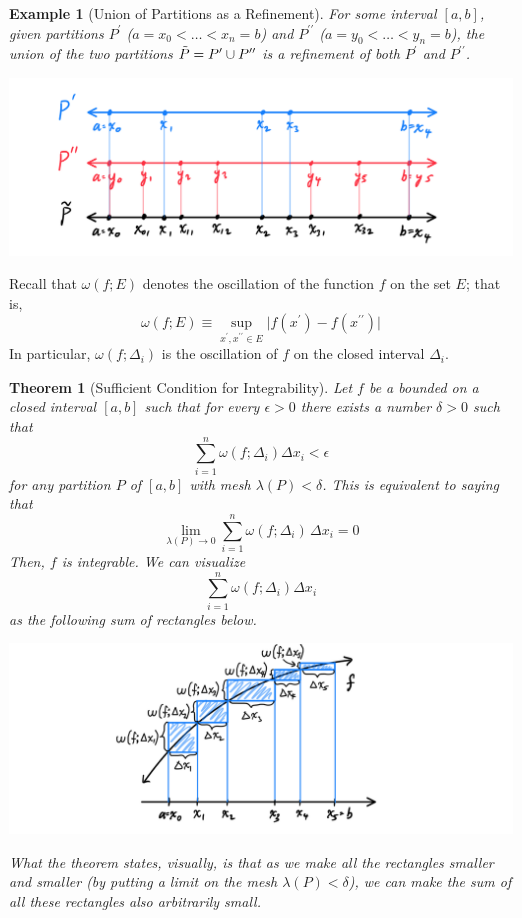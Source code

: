 \documentclass{article}
\newtheorem{theorem}{Theorem}[section]
\newtheorem{example}{Example}[section]
\theoremstyle{remark}
\theoremstyle{definition}
\begin{document}
\begin{example}[Union of Partitions as a Refinement]
For some interval $[a, b]$, given partitions $P^\prime$ ($a = x_0 < \ldots < x_n = b$) and $P^{\prime\prime}$ ($a = y_0 < \ldots < y_n = b$), the union of the two partitions $\Tilde{P} = P^\prime \cup P^{\prime\prime}$ is a refinement of both $P^\prime$ and $P^{\prime\prime}$. 
\begin{center}
    \includegraphics[scale=0.3]{img/Refinement_as_Union_of_Partitions.PNG}
\end{center}
\end{example}

Recall that $\omega(f; E)$ denotes the oscillation of the function $f$ on the set $E$; that is, 
\[\omega(f; E) \equiv \sup_{x^\prime, x^{\prime\prime} \in E} \big| f(x^\prime) - f(x^{\prime\prime})\big|\]
In particular, $\omega(f; \Delta_i)$ is the oscillation of $f$ on the closed interval $\Delta_i$. 

\begin{theorem}[Sufficient Condition for Integrability]
Let $f$ be a bounded on a closed interval $[a, b]$ such that for every $\epsilon > 0$ there exists a number $\delta>0$ such that
\[\sum_{i=1}^n \omega(f; \Delta_i) \Delta x_i < \epsilon\]
for any partition $P$ of $[a, b]$ with mesh $\lambda(P) < \delta$. This is equivalent to saying that
\[\lim_{\lambda(P) \rightarrow 0} \sum_{i = 1}^n \omega (f; \Delta_i) \, \Delta x_i = 0\]
Then, $f$ is integrable. We can visualize
\[\sum_{i=1}^n \omega(f; \Delta_i) \Delta x_i\]
as the following sum of rectangles below. 
\begin{center}
    \includegraphics[scale=0.3]{img/Sufficient_Condition_for_Integrability.PNG}
\end{center}
What the theorem states, visually, is that as we make all the rectangles smaller and smaller (by putting a limit on the mesh $\lambda(P)<\delta$), we can make the sum of all these rectangles also arbitrarily small. 
\end{theorem}
\end{document}
